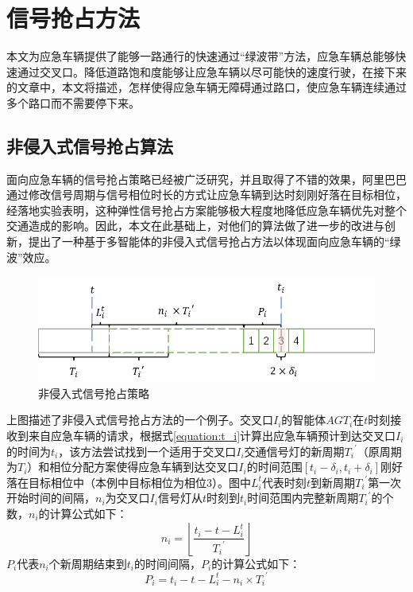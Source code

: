 

\section{信号抢占方法}
本文为应急车辆提供了能够一路通行的快速通过“绿波带”方法，应急车辆总能够快速通过交叉口。降低道路饱和度能够让应急车辆以尽可能快的速度行驶，在接下来的文章中，本文将描述，怎样使得应急车辆无障碍通过路口，使应急车辆连续通过多个路口而不需要停下来。


\subsection{非侵入式信号抢占算法}
面向应急车辆的信号抢占策略已经被广泛研究，并且取得了不错的效果，阿里巴巴\cite{min}通过修改信号周期与信号相位时长的方式让应急车辆到达时刻刚好落在目标相位，经落地实验表明，这种弹性信号抢占方案能够极大程度地降低应急车辆优先对整个交通造成的影响。因此，本文在此基础上，对他们的算法做了进一步的改进与创新，提出了一种基于多智能体的非侵入式信号抢占方法以体现面向应急车辆的“绿波”效应。

\begin{figure}[ht]
	\centering
	\includegraphics[width=\textwidth]{figures/non-invasive.png}
	\caption{非侵入式信号抢占策略}
	\label{fig:non-invasive}
\end{figure}

上图描述了非侵入式信号抢占方法的一个例子。交叉口${I_i}$的智能体${AGT_i}$在${t}$时刻接收到来自应急车辆的请求，根据式\ref{equation:t_i}计算出应急车辆预计到达交叉口${I_i}$的时间为${t_i}$，该方法尝试找到一个适用于交叉口${I_i}$交通信号灯的新周期${{T_i}^\prime}$（原周期为${T_i}$）和相位分配方案使得应急车辆到达交叉口${I_i}$的时间范围${[t_i-\delta_i, t_i+\delta_i]}$刚好落在目标相位中（本例中目标相位为相位3）。图中${L_i^t}$代表时刻${t}$到新周期${{T_i}^\prime}$第一次开始时间的间隔，${n_i}$为交叉口${I_i}$信号灯从${t}$时刻到${t_i}$时间范围内完整新周期${{T_i}^\prime}$的个数，${n_i}$的计算公式如下：%
\begin{equation}
	\label{equation:ni}
	n_i=\left\lfloor\frac{t_i-t-L_i^t}{{T_i}^\prime}\right\rfloor
\end{equation}
${P_i}$代表${n_i}$个新周期结束到${t_i}$的时间间隔，${P_i}$的计算公式如下：
\begin{equation}
	\label{equation:pi}
	P_i=t_i-t-L_i^t-n_i\times{{T_i}^\prime}
\end{equation}

